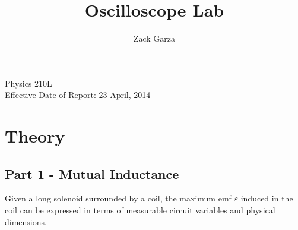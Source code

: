 \documentclass[twocolumn,english]{IEEEtran}
\theoremstyle{plain}
\theoremstyle{plain}
\begin{document}
\title{Oscilloscope Lab}


\author{Zack Garza}


\IEEEspecialpapernotice
{Physics 210L \\
Effective Date of Report: 23 April, 2014}



\maketitle

\tableofcontents

\section{Theory}
\subsection{Part 1 - Mutual Inductance}
Given a long solenoid surrounded by a coil, the maximum emf $\varepsilon$ induced in the coil can be expressed in terms of measurable circuit variables and physical dimensions.
\end{document}
